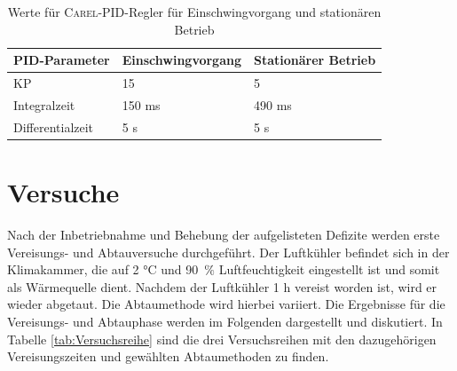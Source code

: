 \begin{table}[htb]
\centering
\caption{Werte für \textsc{Carel}-PID-Regler für Einschwingvorgang und stationären Betrieb}\vspace{6pt}
\begin{tabular}{lll}
\hline 
\textbf{PID-Parameter} & \textbf{Einschwingvorgang} & \textbf{Stationärer Betrieb} \\ 
\hline 
\hline
KP & 15 & 5 \\ 
\hline 
Integralzeit & 150 ms & 490 ms \\ 
\hline 
Differentialzeit & 5 s & 5 s \\ 
\hline 
\hline
\end{tabular} 
\label{tab:Regler_Uebersicht}
\end{table}






\section{Versuche}
\label{sec:Versuche}

Nach der Inbetriebnahme und Behebung der aufgelisteten Defizite werden erste Vereisungs- und Abtauversuche durchgeführt. Der Luftkühler befindet sich in der Klimakammer, die auf 2 °C und \mbox{90 $\%$} Luftfeuchtigkeit eingestellt ist und somit als Wärmequelle dient. Nachdem der Luftkühler 1 h vereist worden ist, wird er wieder abgetaut. Die Abtaumethode wird hierbei variiert. Die Ergebnisse für die Vereisungs- und Abtauphase werden im Folgenden dargestellt und diskutiert. In Tabelle \ref{tab:Versuchsreihe} sind die drei Versuchsreihen mit den dazugehörigen Vereisungszeiten und gewählten Abtaumethoden zu finden. 


